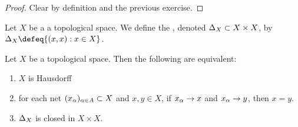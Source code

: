 \documentclass{book}
\begin{document}
	\begin{proof}
		Clear by definition and the previous exercise.
	\end{proof}

	\begin{defn} 
		Let $X$ be a a topological space. We define the , denoted $\Delta_X \subset X \times X$, by $\Del_X \defeq \{(x,x):x \in X\}$.
	\end{defn}
	
	\begin{ex} 
		Let $X$ be a topological space. Then the following are equivalent: 
		\begin{enumerate}
			\item $X$ is Hausdorff
			\item for each net $(x_{\alpha})_{\alpha \in A} \subset X$ and $x,y \in X$, if $x_{\alpha} \rightarrow x$ and $x_{\alpha} \rightarrow y$, then $x = y$.
			\item $\Delta_X$ is closed in $X \times X$.
		\end{enumerate} 
	\end{ex}
	
\end{document}
